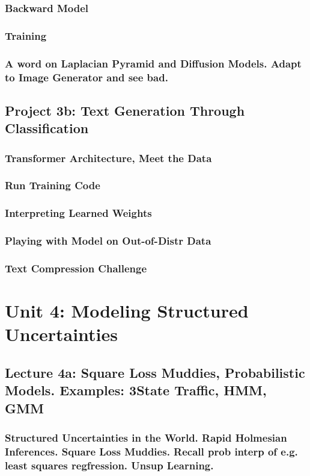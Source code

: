 \documentclass[12pt]{article}
\begin{document}
      \subsubsection*{Backward Model}
      \subsubsection*{Training}
      \subsubsection*{A word on Laplacian Pyramid and Diffusion Models.  Adapt to Image Generator and see bad.}
    \newpage

    \subsection*{Project 3b: Text Generation Through Classification}
      \subsubsection*{Transformer Architecture, Meet the Data}
      \subsubsection*{Run Training Code}
      \subsubsection*{Interpreting Learned Weights}
      \subsubsection*{Playing with Model on Out-of-Distr Data}
      \subsubsection*{Text Compression Challenge}
    \newpage

  \section*{\sc Unit 4: Modeling Structured Uncertainties}
    \subsection*{Lecture 4a: Square Loss Muddies, Probabilistic Models.  Examples: 3State Traffic, HMM, GMM}
      \subsubsection*{Structured Uncertainties in the World.  Rapid Holmesian
      Inferences.  Square Loss Muddies.  Recall prob interp of e.g. least
      squares regfression.  Unsup Learning.}
\end{document}
